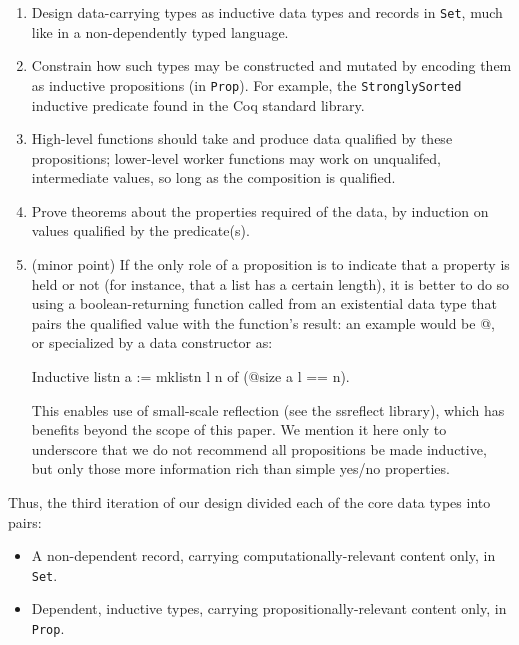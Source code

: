 \documentclass{llncs}
\begin{document}
\begin{enumerate}
\item Design data-carrying types as inductive data types and records in
  \texttt{Set}, much like in a non-dependently typed language.

\item Constrain how such types may be constructed and mutated by encoding them
  as inductive propositions (in \texttt{Prop}).  For example, the
  \texttt{StronglySorted} inductive predicate found in the Coq standard
  library.

\item High-level functions should take and produce data qualified by these
  propositions; lower-level worker functions may work on unqualifed,
  intermediate values, so long as the composition is qualified.

\item Prove theorems about the properties required of the data, by induction
  on values qualified by the predicate(s).

\item (minor point) If the only role of a proposition is to indicate
  that a property is held or not (for instance, that a list has a
  certain length), it is better to do so using a boolean-returning
  function called from an existential data type that pairs the
  qualified value with the function's result: an example would be
  @, or specialized by a data
  constructor as:

\begin{MyCoqExampleStar}
Inductive listn {a} := mklistn l n of (@size a l == n).
\end{MyCoqExampleStar}
  
  This enables use of small-scale reflection (see the \textsf{ssreflect}
  library), which has benefits beyond the scope of this paper.  We mention it
  here only to underscore that we do not recommend all propositions be made
  inductive, but only those more information rich than simple yes/no properties.

\end{enumerate}

Thus, the third iteration of our design divided each of the core data types
into pairs:

\begin{itemize}
\item A non-dependent record, carrying computationally-relevant content only,
  in \texttt{Set}.

\item Dependent, inductive types, carrying propositionally-relevant content
  only, in \texttt{Prop}.
\end{itemize}
\end{document}
